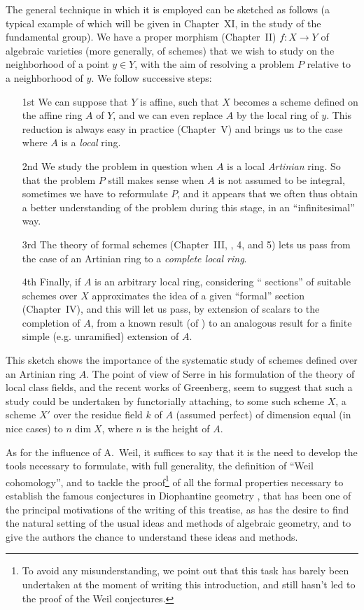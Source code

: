 The general technique in which it is employed can be sketched as follows (a
typical example of which will be given in Chapter~XI, in the study of the
fundamental group). We have a proper morphism (Chapter~II) $f:X\to Y$ of
algebraic varieties (more generally, of schemes) that we wish to study on the
neighborhood of a point $y\in Y$, with the aim of resolving a problem $P$
relative to a neighborhood of $y$. We follow successive steps:
\begin{itemize}
  \item[1st]
     We can suppose that $Y$ is affine, such that $X$ becomes a scheme
     defined on the affine ring $A$ of $Y$, and we can even replace $A$
     by the local ring of $y$. This reduction is always easy in practice
     (Chapter~V) and brings us to the case where $A$ is a {\it local} ring.
  \item[2nd]
     We study the problem in question when $A$ is a local {\it Artinian}
     ring. So that the problem $P$ still makes sense when $A$ is not
     assumed to be integral, sometimes we have to reformulate $P$, and it
     appears that we often thus obtain a better understanding of the problem
     during this stage, in an ``infinitesimal'' way.
  \item[3rd]
     The theory of formal schemes
     (Chapter~III, \textsection{}, 4, and 5) lets us pass from the
     case of an Artinian ring to a {\it complete local ring}.
  \item[4th]
     Finally, if $A$ is an arbitrary local ring, considering
     `` sections'' of suitable schemes over $X$
     approximates the idea of a given ``formal'' section (Chapter~IV), and
     this will let us pass,
     by extension of scalars to the completion of $A$, from a known result (of
     \completelyunsure) to an analogous result for a finite simple
     (e.g. unramified) extension of $A$.
\end{itemize}

This sketch shows the importance of the systematic study of schemes defined over
an Artinian ring $A$. The point of view of Serre in his formulation of the
theory of local class fields, and the recent works of Greenberg, seem
to suggest that such a study could be undertaken by functorially attaching, to
some such scheme $X$, a scheme $X'$ over the residue field $k$ of $A$ (assumed
perfect) of dimension equal (in nice cases) to $n\dim X$, where $n$ is
the height of $A$.

As for the influence of A.~Weil, it suffices to say that it is the need to
develop the tools necessary to formulate, with full generality, the definition
of ``Weil cohomology'', and to tackle the proof\footnote{To avoid any
misunderstanding, we point out that this task has barely been undertaken at the
moment of writing this introduction, and still hasn't led to the proof of the
Weil conjectures.} of all the formal properties necessary to establish the
famous conjectures in Diophantine geometry \cite{I-19}, that has been one of the
principal motivations of the writing of this treatise, as has the desire to find
the natural setting of the usual ideas and methods of algebraic geometry, and to
give the authors the chance to understand these ideas and methods.

